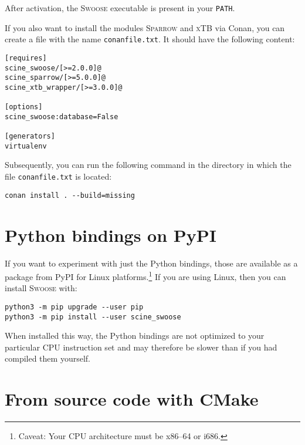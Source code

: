 \documentclass[]{tufte-book}
\begin{document}
After activation, the \textsc{Swoose} executable is present in your \texttt{PATH}.

If you also want to install the modules \textsc{Sparrow} and \textsc{xTB} via Conan, you can create a file with the name \texttt{conanfile.txt}. It should have the following content:

\begin{mdframed}[backgroundcolor=LightSteelBlue!25, linewidth=0pt]
\begin{verbatim}
[requires]
scine_swoose/[>=2.0.0]@
scine_sparrow/[>=5.0.0]@
scine_xtb_wrapper/[>=3.0.0]@

[options]
scine_swoose:database=False

[generators]
virtualenv
\end{verbatim}
\end{mdframed}

Subsequently, you can run the following command in the directory in which the file \texttt{conanfile.txt} is located:
\begin{mdframed}[backgroundcolor=LightSteelBlue!25, linewidth=0pt]
\begin{verbatim}
conan install . --build=missing
\end{verbatim}
\end{mdframed}

\section{Python bindings on PyPI}
If you want to experiment with just the Python bindings, those are available as
a package from PyPI for Linux platforms.\footnote{Caveat: Your CPU architecture
must be x86--64 or i686.} If you are using Linux, then you can install
\textsc{Swoose} with:

\begin{mdframed}[backgroundcolor=LightSteelBlue!25, linewidth=0pt]
\begin{verbatim}
python3 -m pip upgrade --user pip
python3 -m pip install --user scine_swoose
\end{verbatim}
\end{mdframed}

When installed this way, the Python bindings are not optimized to your
particular CPU instruction set and may therefore be slower than if you had
compiled them yourself.

\section{From source code with CMake}
\end{document}
